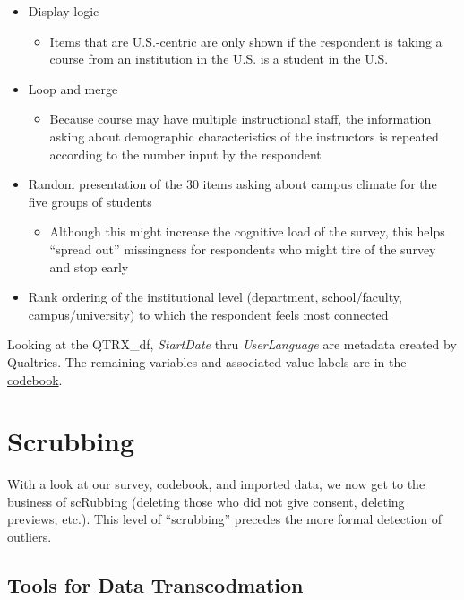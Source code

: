 \documentclass[
  english,
]{book}
\providecommand{\tightlist}{%
  \setlength{\itemsep}{0pt}\setlength{\parskip}{0pt}}
\begin{document}
\begin{itemize}
\tightlist
\item
  Display logic

  \begin{itemize}
  \tightlist
  \item
    Items that are U.S.-centric are only shown if the respondent is taking a course from an institution in the U.S. is a student in the U.S.
  \end{itemize}
\item
  Loop and merge

  \begin{itemize}
  \tightlist
  \item
    Because course may have multiple instructional staff, the information asking about demographic characteristics of the instructors is repeated according to the number input by the respondent
  \end{itemize}
\item
  Random presentation of the 30 items asking about campus climate for the five groups of students

  \begin{itemize}
  \tightlist
  \item
    Although this might increase the cognitive load of the survey, this helps ``spread out'' missingness for respondents who might tire of the survey and stop early
  \end{itemize}
\item
  Rank ordering of the institutional level (department, school/faculty, campus/university) to which the respondent feels most connected
\end{itemize}

Looking at the QTRX\_df, \emph{StartDate} thru \emph{UserLanguage} are metadata created by Qualtrics. The remaining variables and associated value labels are in the \href{./Rate-a-Course_Codebook.pdf}{codebook}.

\hypertarget{scrubbing}{%
\section{Scrubbing}\label{scrubbing}}

With a look at our survey, codebook, and imported data, we now get to the business of scRubbing (deleting those who did not give consent, deleting previews, etc.). This level of ``scrubbing'' precedes the more formal detection of outliers.

\hypertarget{tools-for-data-transcodmation}{%
\subsection{Tools for Data Transcodmation}\label{tools-for-data-transcodmation}}
\end{document}
